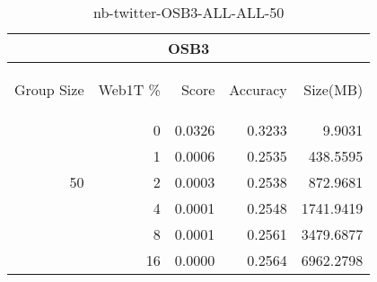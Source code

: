 \begin{center}
\begin{table}[htbp] 
 \begin{center}
\begin{tabular}{ | r | r | r | r | r |}
\hline
\multicolumn{5}{|c|}{OSB3}\\
\hline
\begin{sideways}Group Size\end{sideways} & \begin{sideways}Web1T \%\end{sideways} & \begin{sideways}Score\end{sideways} & \begin{sideways}Accuracy\end{sideways} & \begin{sideways}Size(MB)\end{sideways}\\
\hline
\multirow{5}{*}{50}
 & 0 & 0.0326 & 0.3233 & 9.9031\\ \cline{2-5}
 & 1 & 0.0006 & 0.2535 & 438.5595\\ \cline{2-5}
 & 2 & 0.0003 & 0.2538 & 872.9681\\ \cline{2-5}
 & 4 & 0.0001 & 0.2548 & 1741.9419\\ \cline{2-5}
 & 8 & 0.0001 & 0.2561 & 3479.6877\\ \cline{2-5}
 & 16 & 0.0000 & 0.2564 & 6962.2798\\ \cline{2-5}
\hline
\end{tabular}
\caption{nb-twitter-OSB3-ALL-ALL-50}
\label{table:nb-twitter-OSB3-ALL-ALL-50}
\end{center}
 \end{table}
\end{center}

